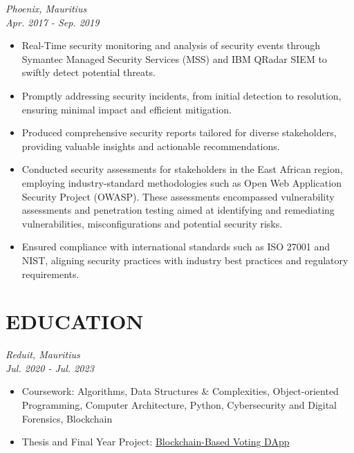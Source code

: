 \documentclass[a4paper, fleqn, oneside]{article}
\begin{document}
\vspace{2em}
{ \hfill \textit{Phoenix, Mauritius}} \\
{ \hfill {\textit{Apr. 2017 - Sep. 2019}}}
\begin{itemize}
\item Real-Time security monitoring and analysis of security events through Symantec Managed Security Services (MSS) and IBM QRadar SIEM to swiftly detect potential threats.
\item Promptly addressing security incidents, from initial detection to resolution, ensuring minimal impact and efficient mitigation.
\item Produced comprehensive security reports tailored for diverse stakeholders, providing valuable insights and actionable recommendations.
\item Conducted security assessments for stakeholders in the East African region, employing industry-standard methodologies such as Open Web Application Security Project (OWASP). These assessments encompassed vulnerability assessments and penetration testing aimed at identifying and remediating vulnerabilities, misconfigurations and potential security risks.
\item Ensured compliance with international standards such as ISO 27001 and NIST, aligning security practices with industry best practices and regulatory requirements.
\end{itemize}

\vspace{2em}
\section{EDUCATION}
\label{sec:orgd4a97f0}
{ \hfill \textit{Reduit, Mauritius}} \\
{ \hfill {\textit{Jul. 2020 - Jul. 2023}}}
\begin{itemize}
\item Coursework: Algorithms, Data Structures \& Complexities, Object-oriented Programming, Computer Architecture, Python, Cybersecurity and Digital Forensics, Blockchain
\item Thesis and Final Year Project: \href{https://github.com/s-takoor/mi-voting}{Blockchain-Based Voting DApp}
\end{itemize}
\end{document}
